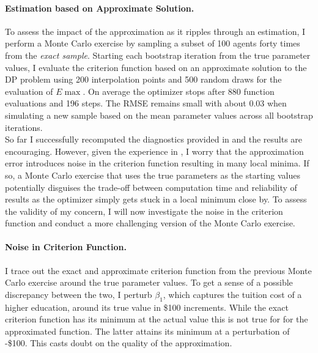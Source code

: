 \paragraph{Estimation based on Approximate Solution.}
To assess the impact of the approximation as it ripples through an estimation, I perform a Monte Carlo exercise by sampling a subset of 100 agents forty times from the \textit{exact sample}. Starting each  bootstrap iteration from the true parameter values, I evaluate the criterion function based on an approximate solution to the DP problem using 200 interpolation points and 500 random draws for the evaluation of $E\max$. On average the optimizer stops after 880 function evaluations and 196 steps. The RMSE remains small with about 0.03 when simulating a new sample based on the mean parameter values across all bootstrap iterations. \\\newline
%
So far I successfully recomputed the diagnostics provided in \citet{Keane.1994} and the results are encouraging. However, given the experience in \citet{Eisenhauer.2015b}, I worry that the approximation error introduces noise in the criterion function resulting in many local minima. If so, a Monte Carlo exercise that uses the true parameters as the starting values potentially disguises the trade-off between computation time and reliability of results as the optimizer simply gets stuck in a local minimum close by. To assess the validity of my concern, I will now investigate the noise in the criterion function and conduct a more challenging version of the Monte Carlo exercise.
\paragraph{Noise in Criterion Function.}
I trace out the exact and approximate criterion function from the previous Monte Carlo exercise around the true parameter values. To get a sense of a possible discrepancy between the two, I perturb $\beta_1$, which captures the tuition cost of a higher education, around its true value in \$100 increments. While the exact criterion function has its minimum at the actual value this is not true for for the approximated function. The latter attains its minimum at a perturbation of -\$100. This casts doubt on the quality of the approximation.

